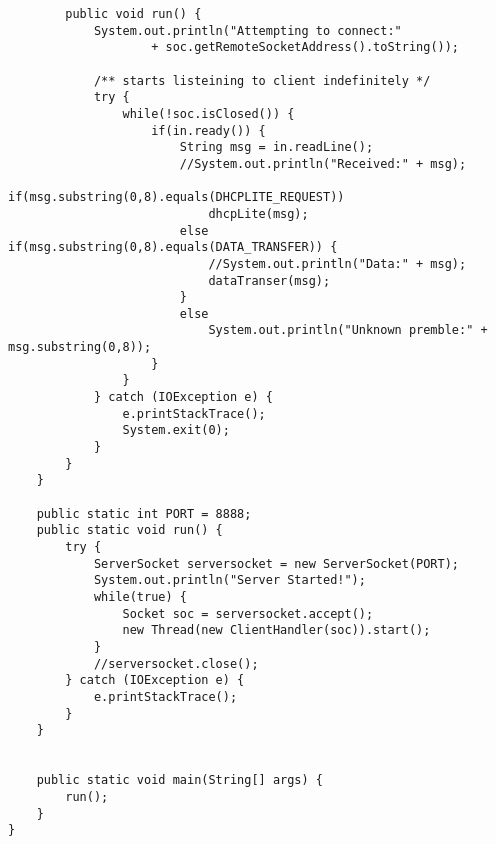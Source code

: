 \begin{verbatim}
		public void run() {
			System.out.println("Attempting to connect:" 	
					+ soc.getRemoteSocketAddress().toString());

			/** starts listeining to client indefinitely */ 
			try {
				while(!soc.isClosed()) {
					if(in.ready()) {
						String msg = in.readLine();
						//System.out.println("Received:" + msg);
						if(msg.substring(0,8).equals(DHCPLITE_REQUEST))
							dhcpLite(msg);
						else if(msg.substring(0,8).equals(DATA_TRANSFER)) {
							//System.out.println("Data:" + msg);
							dataTranser(msg);
						}
						else
							System.out.println("Unknown premble:" + msg.substring(0,8));
					}
				}
			} catch (IOException e) {
				e.printStackTrace();
				System.exit(0);
			}
		}
	}

	public static int PORT = 8888;
	public static void run() {
		try {
			ServerSocket serversocket = new ServerSocket(PORT);
			System.out.println("Server Started!");	
			while(true) {
				Socket soc = serversocket.accept();
				new Thread(new ClientHandler(soc)).start();
			}
			//serversocket.close();
		} catch (IOException e) {
			e.printStackTrace();
		}
	}


	public static void main(String[] args) {
		run();
	}
}
\end{verbatim}
